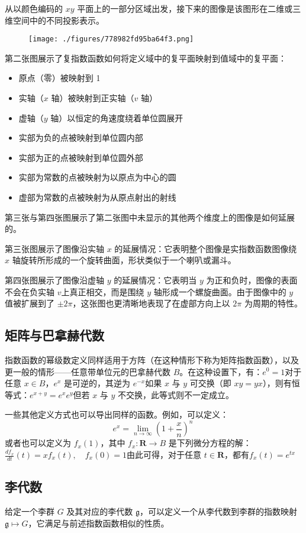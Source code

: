 从以颜色编码的 $xy$ 平面上的一部分区域出发，接下来的图像是该图形在二维或三维空间中的不同投影表示。
\begin{figure}[ht]
\centering
\texttt{[image: ./figures/778982fd95ba64f3.png]}
\caption{} \label{fig_ZShs_7}
\end{figure}
第二张图展示了复指数函数如何将定义域中的复平面映射到值域中的复平面：
\begin{itemize}
\item 原点（零）被映射到 1
\item 实轴（$x$ 轴）被映射到正实轴（$v$ 轴）
\item 虚轴（$y$ 轴）以恒定的角速度绕着单位圆展开
\item 实部为负的点被映射到单位圆内部
\item 实部为正的点被映射到单位圆外部
\item 实部为常数的点被映射为以原点为中心的圆
\item 虚部为常数的点被映射为从原点射出的射线
\end{itemize}
第三张与第四张图展示了第二张图中未显示的其他两个维度上的图像是如何延展的。

第三张图展示了图像沿实轴 $x$ 的延展情况：它表明整个图像是实指数函数图像绕 $x$ 轴旋转所形成的一个旋转曲面，形状类似于一个喇叭或漏斗。

第四张图展示了图像沿虚轴 $y$ 的延展情况：它表明当 $y$ 为正和负时，图像的表面不会在负实轴 $v$上真正相交，而是围绕 $y$ 轴形成一个螺旋曲面。由于图像中的 $y$ 值被扩展到了 $\pm 2\pi$，这张图也更清晰地表现了在虚部方向上以 $2\pi$ 为周期的特性。
\subsection{矩阵与巴拿赫代数}
指数函数的幂级数定义同样适用于方阵（在这种情形下称为矩阵指数函数），以及更一般的情形——任意带单位元的巴拿赫代数 $B$。在这种设置下，有：$e^0 = 1$对于任意 $x \in B$，$e^x$ 是可逆的，其逆为 $e^{-x}$如果 $x$ 与 $y$ 可交换（即 $xy = yx$），则有恒等式：$e^{x + y} = e^x e^y$但若 $x$ 与 $y$ 不交换，此等式则不一定成立。

一些其他定义方式也可以导出同样的函数。例如，可以定义：
$$
e^x = \lim_{n \to \infty} \left(1 + \frac{x}{n} \right)^n~
$$
或者也可以定义为 $f_x(1)$，其中 $f_x: \mathbf{R} \to B$ 是下列微分方程的解：$\frac{d f_x}{dt}(t) = x f_x(t), \quad f_x(0) = 1$由此可得，对于任意 $t \in \mathbf{R}$，都有$f_x(t) = e^{tx}$
\subsection{李代数}
给定一个李群 $G$ 及其对应的李代数 $\mathfrak{g}$，可以定义一个从李代数到李群的指数映射 $\mathfrak{g} \mapsto G$，它满足与前述指数函数相似的性质。

